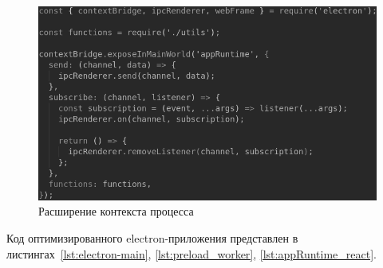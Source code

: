 \begin{figure}[H]
  \centering
  \includegraphics[height=0.2\textheight]{assets/images/practical/contextBridge.png}
  \caption{Расширение контекста процесса}
  \label{img:contextBridge}
\end{figure}

Код оптимизированного electron-приложения представлен в листингах~\ref{lst:electron-main}, \ref{lst:preload_worker}, \ref{lst:appRuntime_react}.
